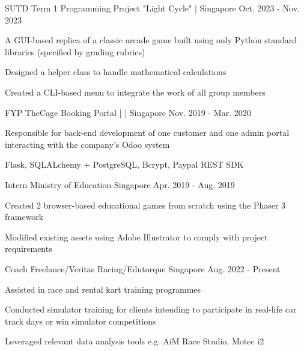 \begin{cventries}
  \cventry
    {SUTD Term 1 Programming Project} %
    {"Light Cycle" | } %
    {Singapore} %
    {Oct. 2023 - Nov. 2023} %
    {
      \begin{cvitems} %
        \item {A GUI-based replica of a classic arcade game built using only Python standard libraries (specified by grading rubrics)}
        \item {Designed a helper class to handle mathematical calculations}
        \item {Created a CLI-based menu to integrate the work of all group members}
      \end{cvitems}
    }
  
  \cventry
    {FYP} %
    {TheCage Booking Portal |  | } %
    {Singapore} %
    {Nov. 2019 - Mar. 2020} %
    {
      \begin{cvitems} %
        \item {Responsible for back-end development of one customer and one admin portal interacting with the company's Odoo system}
        \item {Flask, SQLALchemy + PostgreSQL, Bcrypt, Paypal REST SDK}
      \end{cvitems}
    }

  \cventry
    {Intern} %
    {Ministry of Education} %
    {Singapore} %
    {Apr. 2019 - Aug. 2019} %
    {
      \begin{cvitems} %
        \item {Created 2 browser-based educational games from scratch using the Phaser 3 framework}
        \item {Modified existing assets using Adobe Illustrator to comply with project requirements}
      \end{cvitems}
    }

  \cventry
    {Coach} %
    {Freelance/Veritas Racing/Edutorque} %
    {Singapore} %
    {Aug. 2022 - Present} %
    {
      \begin{cvitems} %
        \item {Assisted in race and rental kart training programmes}
        \item {Conducted simulator training for clients intending to participate in real-life car track days or win simulator competitions}
        \item {Leveraged relevant data analysis tools e.g. AiM Race Studio, Motec i2}
      \end{cvitems}
    }
\end{cventries}
